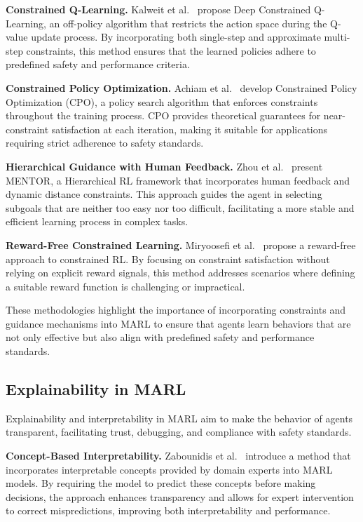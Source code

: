 \documentclass[pdflatex,sn-mathphys-num]{sn-jnl}%
\theoremstyle{thmstyleone}%
\theoremstyle{thmstyletwo}%
\theoremstyle{thmstylethree}%
\begin{document}
\textbf{Constrained Q-Learning.} Kalweit et al.~\cite{kalweit2020deep} propose Deep Constrained Q-Learning, an off-policy algorithm that restricts the action space during the Q-value update process. By incorporating both single-step and approximate multi-step constraints, this method ensures that the learned policies adhere to predefined safety and performance criteria.

\textbf{Constrained Policy Optimization.} Achiam et al.~\cite{achiam2017constrained} develop Constrained Policy Optimization (CPO), a policy search algorithm that enforces constraints throughout the training process. CPO provides theoretical guarantees for near-constraint satisfaction at each iteration, making it suitable for applications requiring strict adherence to safety standards.

\textbf{Hierarchical Guidance with Human Feedback.} Zhou et al.~\cite{zhou2024mentor} present MENTOR, a Hierarchical RL framework that incorporates human feedback and dynamic distance constraints. This approach guides the agent in selecting subgoals that are neither too easy nor too difficult, facilitating a more stable and efficient learning process in complex tasks.

\textbf{Reward-Free Constrained Learning.} Miryoosefi et al.~\cite{miryoosefi2021} propose a reward-free approach to constrained RL. By focusing on constraint satisfaction without relying on explicit reward signals, this method addresses scenarios where defining a suitable reward function is challenging or impractical.

These methodologies highlight the importance of incorporating constraints and guidance mechanisms into MARL to ensure that agents learn behaviors that are not only effective but also align with predefined safety and performance standards.


\subsection{Explainability in MARL}\label{sub-sec:rel_evaluation}

Explainability and interpretability in MARL aim to make the behavior of agents transparent, facilitating trust, debugging, and compliance with safety standards.

\textbf{Concept-Based Interpretability.} Zabounidis et al.~\cite{zabounidis2023concept} introduce a method that incorporates interpretable concepts provided by domain experts into MARL models. By requiring the model to predict these concepts before making decisions, the approach enhances transparency and allows for expert intervention to correct mispredictions, improving both interpretability and performance.
\end{document}
